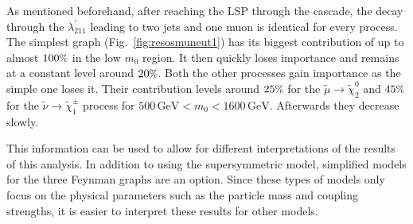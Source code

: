\noindent As mentioned beforehand, after reaching the LSP through the cascade, the decay through the $\lambda^\prime_{211}$ leading to two jets and one muon is identical for every process. The simplest graph (Fig.~\ref{fig:resosmuneut1}) has its biggest contribution of up to almost $100\pct$ in the low $m_0$ region. It then quickly loses importance and remains at a constant level around $20\pct$. Both the other processes gain importance as the simple one loses it. Their contribution levels around $25\pct$ for the $\tilde{\mu} \rightarrow \tilde{\chi}^0_2$ and $45\pct$ for the $\tilde{\nu} \rightarrow \tilde{\chi}^\pm_1$ process for $500\,\text{GeV} < m_0 < 1600\,\text{GeV}$. Afterwards they decrease slowly.

This information can be used to allow for different interpretations of the results of this analysis. In addition to using the supersymmetric model, simplified models for the three Feynman graphs are an option. Since these types of models only focus on the physical parameters such as the particle mass and coupling strengths, it is easier to interpret these results for other models.



